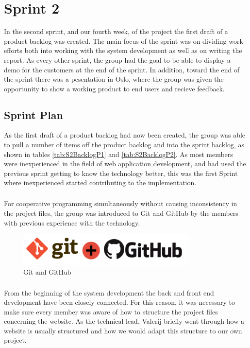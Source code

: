 \chapter{Sprint 2}
\label{chap:S2}
In the second sprint, and our fourth week, of the project the first draft of a product backlog was created. The main focus of the sprint was on dividing work efforts both into working with the system development as well as on writing the report. As every other sprint, the group had the goal to be able to display a demo for the customers at the end of the sprint. In addition, toward the end of the sprint there was a pesentation in Oslo, where the group was given the opportunity to show a working product to end users and recieve feedback.

\section{Sprint Plan}
\label{sec:S2Plan}
As the first draft of a product backlog had now been created, the group was able to pull a number of items off the product backlog and into the sprint backlog, as shown in tables \ref{tab:S2BacklogP1} and \ref{tab:S2BacklogP2}. As most members were inexperienced in the field of web application development, and had used the previous sprint getting to know the technology better, this was the first Sprint where inexperienced started contributing to the implementation. 

\paragraph{}For cooperative programming simultaneously without causing inconsistency in the project files, the group was introduced to Git and GitHub by the members with previous experience with the technology.

\begin{figure}[ht!]
\centering
\includegraphics[width=90mm]{Sprint2/img/Sprint2-GitnGithub.png}
\caption{Git and GitHub \label{fig:S2PlanGit}}
\end{figure}

\paragraph{} From the beginning of the system development the back and front end development have been closely connected. For this reason, it was necessary to make sure every member was aware of how to structure the project files concerning the website. As the technical lead, Valerij briefly went through how a website is usually structured and how we would adapt this structure to our own project. 

